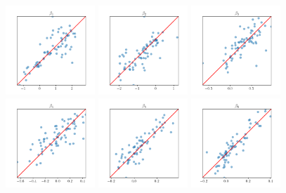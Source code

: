 \begin{figure}
	\centering
	\includegraphics[width=0.3\textwidth]{files/predictions_beta/beta_1.png}
	\includegraphics[width=0.3\textwidth]{files/predictions_beta/beta_2.png}
	\includegraphics[width=0.3\textwidth]{files/predictions_beta/beta_3.png}
	\includegraphics[width=0.3\textwidth]{files/predictions_beta/beta_4.png}
	\includegraphics[width=0.3\textwidth]{files/predictions_beta/beta_5.png}
	\includegraphics[width=0.3\textwidth]{files/predictions_beta/beta_6.png}

\end{figure}
